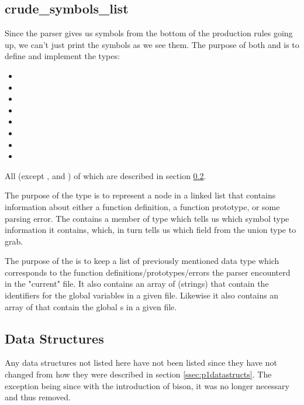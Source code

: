\documentclass{article}
\begin{document}
\subsection{crude\_symbols\_list}
\label{ssec:p2crudesymbolslist}
Since the parser gives us symbols from the bottom of the production rules going up, we can't just print the symbols as we see them.
The purpose of both  and  is to define and implement the types:
\begin{itemize}
    \item {}
    \item {}
    \item {}
    \item {}
    \item {}
    \item {}
    \item {}
    \item {}
\end{itemize}
All (except , and ) of which are described in section \ref{ssec:p2datastructs}.

The purpose of the  type is to represent a node in a linked list that contains information about either a function definition, a function prototype, or some parsing error.
The  contains a member of type  which tells us which symbol type information it contains, which, in turn tells us which field from the union type to grab.

The purpose of the  is to keep a list of previously mentioned data type which corresponds to the function definitions/prototypes/errors the parser encounterd in the "current" file.
It also contains an array of  (strings) that contain the identifiers for the global variables in a given file.
Likewise it also contains an array of  that contain the global s in a given file.

\subsection{Data Structures}
\label{ssec:p2datastructs}
Any data structures not listed here have not been listed since they have not changed from how they were described in section \ref{ssec:p1datastructs}.
The exception being  since with the introduction of bison, it was no longer necessary and thus removed.
\end{document}
